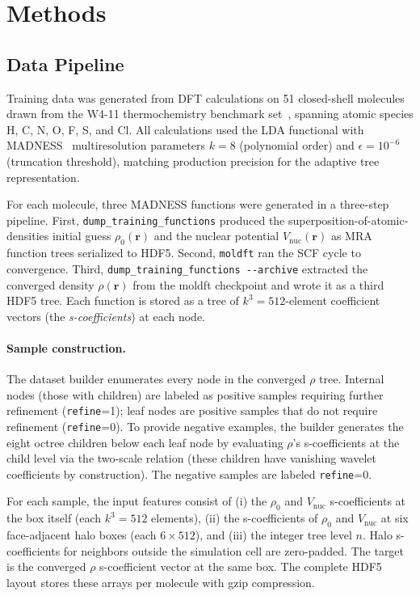 \section{Methods}\label{sec:methods}

\subsection{Data Pipeline}\label{sec:data-pipeline}

Training data was generated from DFT calculations on 51 closed-shell molecules drawn from the W4-11 thermochemistry benchmark set~\cite{karton2011w411}, spanning atomic species H, C, N, O, F, S, and Cl. All calculations used the LDA functional with MADNESS~\cite{harrison2016madness} multiresolution parameters $k=8$ (polynomial order) and $\epsilon = 10^{-6}$ (truncation threshold), matching production precision for the adaptive tree representation.

For each molecule, three MADNESS functions were generated in a three-step pipeline. First, \texttt{dump\_training\_functions} produced the superposition-of-atomic-densities initial guess $\rho_0(\mathbf{r})$ and the nuclear potential $V_\mathrm{nuc}(\mathbf{r})$ as MRA function trees serialized to HDF5. Second, \texttt{moldft} ran the SCF cycle to convergence. Third, \texttt{dump\_training\_functions -{}-archive} extracted the converged density $\rho(\mathbf{r})$ from the moldft checkpoint and wrote it as a third HDF5 tree. Each function is stored as a tree of $k^3 = 512$-element coefficient vectors (the \emph{s-coefficients}) at each node.

\paragraph{Sample construction.}
The dataset builder enumerates every node in the converged $\rho$ tree. Internal nodes (those with children) are labeled as positive samples requiring further refinement (\texttt{refine}=1); leaf nodes are positive samples that do not require refinement (\texttt{refine}=0). To provide negative examples, the builder generates the eight octree children below each leaf node by evaluating $\rho$'s s-coefficients at the child level via the two-scale relation (these children have vanishing wavelet coefficients by construction). The negative samples are labeled \texttt{refine}=0.

For each sample, the input features consist of (i) the $\rho_0$ and $V_\mathrm{nuc}$ s-coefficients at the box itself (each $k^3 = 512$ elements), (ii) the s-coefficients of $\rho_0$ and $V_\mathrm{nuc}$ at six face-adjacent halo boxes (each $6 \times 512$), and (iii) the integer tree level $n$. Halo s-coefficients for neighbors outside the simulation cell are zero-padded. The target is the converged $\rho$ s-coefficient vector at the same box. The complete HDF5 layout stores these arrays per molecule with gzip compression.

